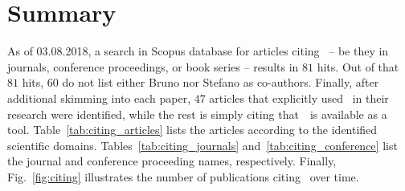 \documentclass[11pt]{article}
\begin{document}
\Header
\Footer 
\FrontPage

\section*{Summary}

As of 03.08.2018, a search in Scopus database for articles citing \uqlab~-- be they in journals, conference proceedings, or book series -- results in $81$ hits.
Out of that $81$ hits, $60$ do not list either Bruno nor Stefano as co-authors.
Finally, after additional skimming into each paper, $47$ articles that explicitly used \uqlab~in their research were identified, while the rest is simply citing that~\uqlab~is available as a tool.
Table~\ref{tab:citing_articles} lists the articles according to the identified scientific domains.
Tables~\ref{tab:citing_journals} and~\ref{tab:citing_conference} list the journal and conference proceeding names, respectively.
Finally, Fig.~\ref{fig:citing} illustrates the number of publications citing \uqlab~over time.
\end{document}
